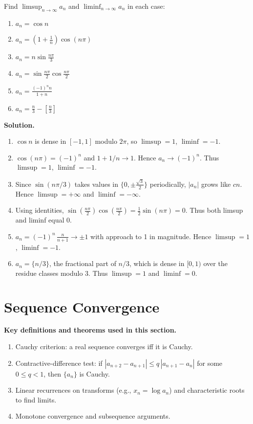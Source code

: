 \begin{problembox}
Find \(\limsup_{n \to \infty} a_n\) and \(\liminf_{n \to \infty} a_n\) in each case:
\begin{enumerate}[label=\alph*)]
\item \(a_n=\cos n\)
\item \(a_n=\left(1 + \frac{1}{n}\right) \cos (n\pi)\)
\item \(a_n=n \sin \frac{n\pi}{3}\)
\item \(a_n=\sin \frac{n\pi}{2} \cos \frac{n\pi}{2}\)
\item \(a_n=\frac{(-1)^n n}{1 + n}\)
\item \(a_n=\frac{n}{3} - \left[\frac{n}{3}\right]\)
\end{enumerate}
\end{problembox}

\noindent\textbf{Solution.}
\begin{enumerate}[label=(\alph*)]
\item \(\cos n\) is dense in \([-1,1]\) modulo \(2\pi\), so \(\limsup=1\), \(\liminf=-1\).
\item \(\cos(n\pi)=(-1)^n\) and \(1+1/n\to 1\). Hence \(a_n\to (-1)^n\). Thus \(\limsup=1\), \(\liminf=-1\).
\item Since \(\sin(n\pi/3)\) takes values in \(\{0,\pm\tfrac{\sqrt{3}}{2}\}\) periodically, \(|a_n|\) grows like \(cn\). Hence \(\limsup=+\infty\) and \(\liminf=-\infty\).
\item Using identities, \(\sin(\tfrac{n\pi}{2})\cos(\tfrac{n\pi}{2})=\tfrac{1}{2}\sin(n\pi)=0\). Thus both limsup and liminf equal 0.
\item \(a_n=(-1)^n\, \tfrac{n}{n+1}\to \pm 1\) with approach to 1 in magnitude. Hence \(\limsup=1\), \(\liminf=-1\).
\item \(a_n=\{n/3\}\), the fractional part of \(n/3\), which is dense in \([0,1)\) over the residue classes modulo 3. Thus \(\limsup=1\) and \(\liminf=0\).
\end{enumerate}

\section{Sequence Convergence}

\noindent\textbf{Key definitions and theorems used in this section.}
\begin{enumerate}
\item Cauchy criterion: a real sequence converges iff it is Cauchy.
\item Contractive-difference test: if \(|a_{n+2}-a_{n+1}|\le q\,|a_{n+1}-a_n|\) for some \(0\le q<1\), then \(\{a_n\}\) is Cauchy.
\item Linear recurrences on transforms (e.g., \(x_n=\log a_n\)) and characteristic roots to find limits.
\item Monotone convergence and subsequence arguments.
\end{enumerate}

